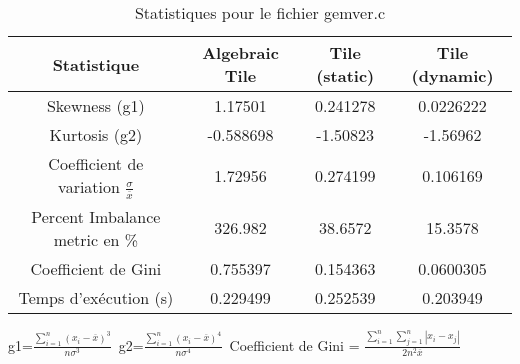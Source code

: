 \documentclass{article}
\begin{document}
\begin{table}[htbp]
  \centering
  \caption{Statistiques pour le fichier gemver.c}
  \begin{tabular}{|c|c|c|c|}
    \hline
    Statistique & Algebraic Tile & Tile (static) & Tile (dynamic) \\ 
    \hline
    Skewness (g1)  & 1.17501 & 0.241278 & 0.0226222 \\ 
    Kurtosis (g2)  & -0.588698 & -1.50823 & -1.56962 \\ 
    Coefficient de variation $ \frac{\sigma}{\overline{x}} $ & 1.72956 & 0.274199 & 0.106169\\ 
    Percent Imbalance metric en \% & 326.982 & 38.6572 & 15.3578\\ 
    Coefficient de Gini  & 0.755397 & 0.154363 & 0.0600305\\ 
    Temps d'exécution (s) &  0.229499    &  0.252539   &  0.203949   \\ 

    \hline
  \end{tabular}
\end{table}
g1=$ \frac{\sum_{i=1}^{n} (x_i - \overline{x})^3}{n\sigma^3} $\
g2=$ \frac{\sum_{i=1}^{n} (x_i - \overline{x})^4}{n\sigma^4} $\
Coefficient de Gini = $ \frac{\sum_{i=1}^{n}\sum_{j=1}^{n} |x_i - x_j|}{2n^2\overline{x}} $\
\newpage
\end{document}
